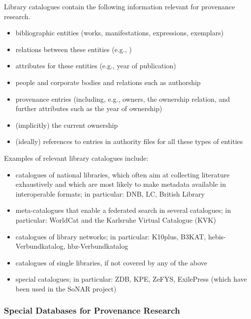 Library catalogues contain the following information relevant for provenance research.
%
\begin{itemize}
  \item
    bibliographic entities (works, manifestations, expressions, exemplars) 
  \item
    relations between these entities (e.g., )
  \item
    attributes for these entities (e.g., year of publication)
  \item
    people and corporate bodies and relations such as authorship
  \item
    provenance entries (including, e.g., owners, the ownership relation, and further attributes such as the year of ownership)
  \item
    (implicitly) the current ownership
  \item
    (ideally) references to entries in authority files for all these types of entities
\end{itemize}
%
Examples of relevant library catalogues include:
%
\begin{itemize}
  \item
    catalogues of national libraries, which often aim at collecting literature exhaustively
    and which are most likely to make metadata available in interoperable formats;
    in particular: DNB, LC, British Library 
  \item
    meta-catalogues that enable a federated search in several catalogues;
    in particular: WorldCat and the Karlsruhe Virtual Catalogue (KVK)
  \item
    catalogues of library networks;
    in particular: K10plus, B3KAT, hebis-Verbundkatalog, hbz-Verbundkatalog
  \item
    catalogues of single libraries, if not covered by any of the above
  \item
    special catalogues;
    in particular: ZDB, KPE, ZeFYS, ExilePress (which have been used in the \gls{SoNAR} project) 
\end{itemize}


\subsubsection{Special Databases for Provenance Research}


